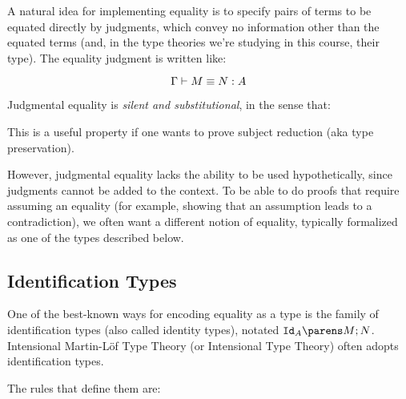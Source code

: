\documentclass[11pt]{article}
\begin{document}
A natural idea for implementing equality is to specify pairs of terms to be equated directly by judgments, which convey no information other than the equated terms (and, in the type theories we're studying in this course, their type). The equality judgment is written like:

\[
	\eqterm{\Gamma}{M}{N}{A}
\]

Judgmental equality is \emph{silent and substitutional}, in the sense that:

\begin{prooftree*}
	\ellipsis{}{\hspace{0.75in}}
	\ellipsis{}{\hspace{0.75in}}
\end{prooftree*}

This is a useful property if one wants to prove subject reduction (aka type preservation).

However, judgmental equality lacks the ability to be used hypothetically, since judgments cannot be added to the context. To be able to do proofs that require assuming an equality (for example, showing that an assumption leads to a contradiction), we often want a different notion of equality, typically formalized as one of the types described below.

\subsection{Identification Types}

One of the best-known ways for encoding equality as a type is the family of identification types (also called identity types), notated $\idtype{A}{M}{N}$. Intensional Martin-L\"of Type Theory (or Intensional Type Theory) often adopts identification types.

The rules that define them are:
\end{document}
